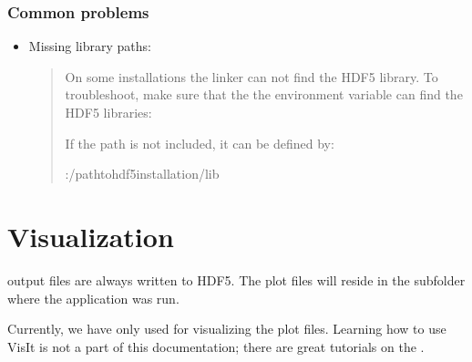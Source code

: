 \documentclass[letterpaper,10pt,english]{sphinxmanual}
\begin{document}
\subsubsection{Common problems}
\label{\detokenize{Base/Installation:common-problems}}\begin{itemize}
\item {} 
Missing library paths:
\begin{quote}

On some installations the linker can not find the HDF5 library.
To troubleshoot, make sure that the the environment variable  can find the HDF5 libraries:

\begin{sphinxVerbatim}[commandchars=\\\{\},formatcom=\scriptsize]
 
\end{sphinxVerbatim}

If the path is not included, it can be defined by:

\begin{sphinxVerbatim}[commandchars=\\\{\},formatcom=\scriptsize]
 :/\PYGZlt{}path\PYGZus{}to\PYGZus{}hdf5\PYGZus{}installation\PYGZgt{}/lib
\end{sphinxVerbatim}
\end{quote}

\end{itemize}


\section{Visualization}
\label{\detokenize{Base/Visualization:visualization}}\label{\detokenize{Base/Visualization:chap-visualization}}\label{\detokenize{Base/Visualization::doc}}
 output files are always written to HDF5.
The plot files will reside in the  subfolder where the application was run.

Currently, we have only used  for visualizing the plot files.
Learning how to use VisIt is not a part of this documentation; there are great tutorials on the .
\end{document}
